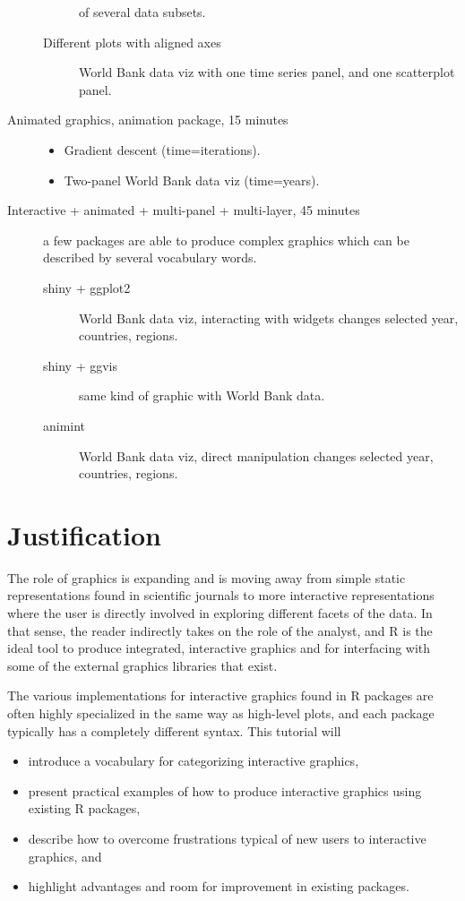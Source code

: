 \documentclass[11pt]{article}
\begin{document}
\begin{description}
\begin{description}
of several data subsets.
\item[{Different plots with aligned axes}] World Bank data viz with one
time series panel, and one scatterplot panel.
\end{description}
\item[{Animated graphics, animation package, 15 minutes}] \begin{itemize}
\item Gradient descent (time=iterations).
\item Two-panel World Bank data viz (time=years).
\end{itemize}
\item[{Interactive + animated + multi-panel + multi-layer, 45 minutes}] a
few packages are able to produce complex graphics which can be
described by several vocabulary words.
\begin{description}
\item[{shiny + ggplot2}] World Bank data viz, interacting with widgets
changes selected year, countries, regions.
\item[{shiny + ggvis}] same kind of graphic with World Bank data.
\item[{animint}] World Bank data viz, direct manipulation changes
selected year, countries, regions.
\end{description}
\end{description}

\section{Justification}
\label{sec:orgheadline11}

The role of graphics is expanding and is moving away from simple
static representations found in scientific journals to more
interactive representations where the user is directly involved in
exploring different facets of the data. In that sense, the reader
indirectly takes on the role of the analyst, and R is the ideal tool
to produce integrated, interactive graphics and for interfacing with
some of the external graphics libraries that exist.

The various implementations for interactive graphics found in R
packages are often highly specialized in the same way as high-level
plots, and each package typically has a completely different
syntax. This tutorial will 
\begin{itemize}
\item introduce a vocabulary for categorizing interactive graphics,
\item present practical examples of how to produce interactive graphics
using existing R packages,
\item describe how to overcome frustrations typical of new users to
interactive graphics, and
\item highlight advantages and room for improvement in existing
packages.
\end{itemize}
\end{document}
